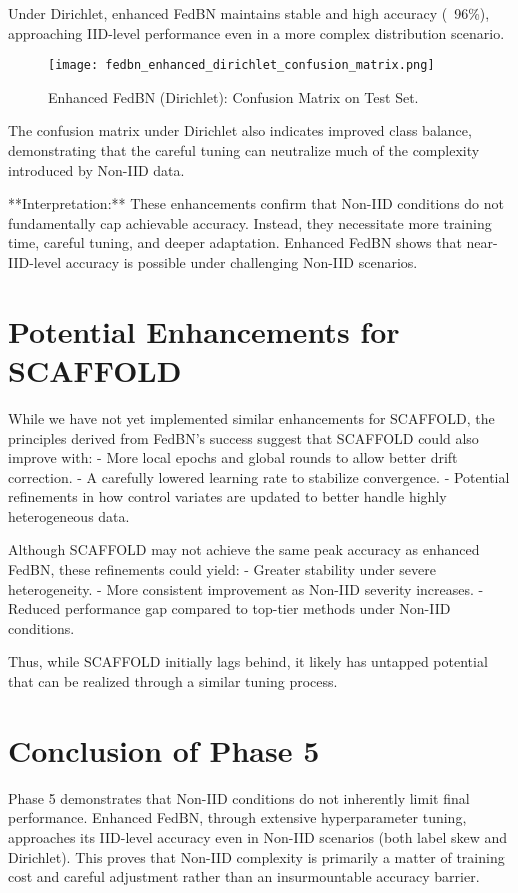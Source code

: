 \documentclass[12pt,a4paper]{report}
\begin{document}
Under Dirichlet, enhanced FedBN maintains stable and high accuracy (~96\%), approaching IID-level performance even in a more complex distribution scenario.

\begin{figure}[H]
	\centering
	\texttt{[image: fedbn\_enhanced\_dirichlet\_confusion\_matrix.png]}
	\caption{Enhanced FedBN (Dirichlet): Confusion Matrix on Test Set.}
\end{figure}

The confusion matrix under Dirichlet also indicates improved class balance, demonstrating that the careful tuning can neutralize much of the complexity introduced by Non-IID data.

**Interpretation:**
These enhancements confirm that Non-IID conditions do not fundamentally cap achievable accuracy. Instead, they necessitate more training time, careful tuning, and deeper adaptation. Enhanced FedBN shows that near-IID-level accuracy is possible under challenging Non-IID scenarios.

\section{Potential Enhancements for SCAFFOLD}

While we have not yet implemented similar enhancements for SCAFFOLD, the principles derived from FedBN’s success suggest that SCAFFOLD could also improve with:
- More local epochs and global rounds to allow better drift correction.
- A carefully lowered learning rate to stabilize convergence.
- Potential refinements in how control variates are updated to better handle highly heterogeneous data.

Although SCAFFOLD may not achieve the same peak accuracy as enhanced FedBN, these refinements could yield:
- Greater stability under severe heterogeneity.
- More consistent improvement as Non-IID severity increases.
- Reduced performance gap compared to top-tier methods under Non-IID conditions.

Thus, while SCAFFOLD initially lags behind, it likely has untapped potential that can be realized through a similar tuning process.

\section{Conclusion of Phase 5}

Phase 5 demonstrates that Non-IID conditions do not inherently limit final performance. Enhanced FedBN, through extensive hyperparameter tuning, approaches its IID-level accuracy even in Non-IID scenarios (both label skew and Dirichlet). This proves that Non-IID complexity is primarily a matter of training cost and careful adjustment rather than an insurmountable accuracy barrier.
\end{document}
